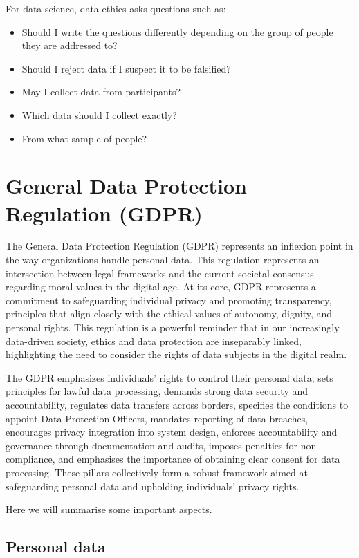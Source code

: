\documentclass[
  12pt,
]{book}
\providecommand{\tightlist}{%
  \setlength{\itemsep}{0pt}\setlength{\parskip}{0pt}}
\begin{document}
For data science, data ethics asks questions such as:

\begin{itemize}
\tightlist
\item
  Should I write the questions differently depending on the group of people they are addressed to?
\item
  Should I reject data if I suspect it to be falsified?
\item
  May I collect data from participants?
\item
  Which data should I collect exactly?
\item
  From what sample of people?
\end{itemize}

\section{General Data Protection Regulation (GDPR)}\label{gdpr}

The General Data Protection Regulation (GDPR) represents an inflexion point in the way organizations handle personal data. This regulation represents an intersection between legal frameworks and the current societal consensus regarding moral values in the digital age. At its core, GDPR represents a commitment to safeguarding individual privacy and promoting transparency, principles that align closely with the ethical values of autonomy, dignity, and personal rights. This regulation is a powerful reminder that in our increasingly data-driven society, ethics and data protection are inseparably linked, highlighting the need to consider the rights of data subjects in the digital realm.

The GDPR emphasizes individuals' rights to control their personal data, sets principles for lawful data processing, demands strong data security and accountability, regulates data transfers across borders, specifies the conditions to appoint Data Protection Officers, mandates reporting of data breaches, encourages privacy integration into system design, enforces accountability and governance through documentation and audits, imposes penalties for non-compliance, and emphasises the importance of obtaining clear consent for data processing. These pillars collectively form a robust framework aimed at safeguarding personal data and upholding individuals' privacy rights.

Here we will summarise some important aspects.

\subsection{Personal data}\label{personal-data}
\end{document}
